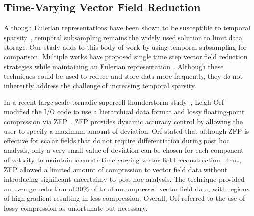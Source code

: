 \subsection{Time-Varying Vector Field Reduction}
%
%
%
%
Although Eulerian representations have been shown to be susceptible to temporal sparsity~\cite{costa2004lagrangian}\cite{Qin2014}\cite{agranovsky2014improved}\cite{sane2018revisiting}, temporal subsampling remains the widely used solution to limit data storage.
%
Our study adds to this body of work by using temporal subsampling for comparison.
%
Multiple works have proposed single time step vector field reduction strategies while maintaining an Eulerian representation~\cite{lodha2000topology}\cite{lodha2003topology}\cite{theisel2003combining}\cite{tong2012salient}.
%
%
%
%
%
Although these techniques could be used to reduce and store data more frequently, they do not inherently address the challenge of increasing temporal sparsity.
%

In a recent large-scale tornadic supercell thunderstorm study~\cite{atmos10100578}, Leigh Orf modified the I/O code to use a hierarchical data format and lossy floating-point compression via ZFP~\cite{lindstrom2006fast}.
%
ZFP provides dynamic accuracy control by allowing the user to specify a maximum amount of deviation.
%
Orf stated that although ZFP is effective for scalar fields that do not require differentiation during post hoc analysis, only a very small value of deviation can be chosen for each component of velocity to maintain accurate time-varying vector field reconstruction. 
%
Thus, ZFP allowed a limited amount of compression to vector field data without introducing significant uncertainty to post hoc analysis. 
%
The technique provided an average reduction of 30\% of total uncompressed vector field data, with regions of high gradient resulting in less compression. 
%
Overall, Orf referred to the use of lossy compression as unfortunate but necessary.

